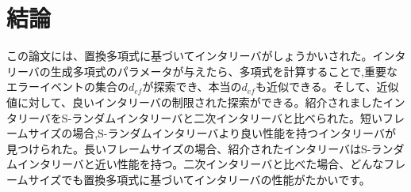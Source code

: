 \documentclass[24 pts]{article}
\begin{document}
\section{結論}
この論文には、置換多項式に基づいてインタリーバがしょうかいされた。インタリーバの生成多項式のパラメータが与えたら、多項式を計算することで,重要なエラーイベントの集合の$d_{ef}$が探索でき、本当の$d_{ef}$も近似できる。そして、近似値に対して、良いインタリーバの制限された探索ができる。紹介されましたインタリーバをS-ランダムインタリーバと二次インタリーバと比べられた。短いフレームサイズの場合,S-ランダムインタリーバより良い性能を持つインタリーバが見つけられた。長いフレームサイズの場合、紹介されたインタリーバはS-ランダムインタリーバと近い性能を持つ。二次インタリーバと比べた場合、どんなフレームサイズでも置換多項式に基づいてインタリーバの性能がたかいです。
\end{document}
